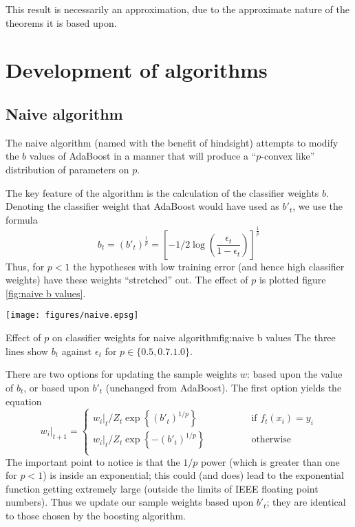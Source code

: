 This result is necessarily an approximation, due to the approximate
nature of the theorems it is based upon.

\section{Development of algorithms}

\subsection{Naive algorithm}

The naive algorithm (named with the benefit of hindsight) attempts to
modify the $b$ values of AdaBoost in a manner that will produce a
``$p$-convex like'' distribution of parameters on $p$.

The key feature of the algorithm is the calculation of the classifier
weights $b$.  Denoting the classifier weight that AdaBoost would have
used as $b'_t$, we use the formula
%
\begin{equation}
b_t = (b'_t)^{\frac{1}{p}} = \left[ - 1/2 \log \left( \frac{\epsilon_t}{1
- \epsilon_t} \right) \right]^\frac{1}{p}
\end{equation}
%
Thus, for $p < 1$ the hypotheses with low training error (and hence
high classifier weights) have these weights ``stretched'' out.  The
effect of $p$ is plotted figure \ref{fig:naive b values}.

\begin{linefigure}
\begin{center}
\texttt{[image: figures/naive.epsg]}
\end{center}
\begin{capt}{Effect of $p$ on classifier weights for naive algorithm}{fig:naive b values}
The three lines show $b_t$ against $\epsilon_t$ for $p \in \{ 0.5,
0.7. 1.0 \}$.
\end{capt}
\end{linefigure}

There are two options for updating the sample weights $w$: based upon
the value of $b_t$, or based upon $b'_t$ (unchanged from AdaBoost).
The first option yields the equation
%
\begin{equation}
w_i|_{t+1} = \left\{
\begin{array}{cl}
	w_i|_t / Z_t \exp \left\{ (b'_t)^{1/p} \right\} & \qquad \qquad \mbox{if
	$f_t(x_i) = y_i$} \\
	w_i|_t / Z_t \exp \left\{ -(b'_t)^{1/p} \right\} 	& \qquad \qquad
	\mbox{otherwise} \\
\end{array} \right.
\end{equation}
%
The important point to notice is that the $1/p$ power (which is
greater than one for $p < 1$) is inside an exponential; this could
(and does) lead to the exponential function getting extremely large
(outside the limits of IEEE floating point numbers).  Thus we update
our sample weights based upon $b'_t$; they are identical to those
chosen by the boosting algorithm.

